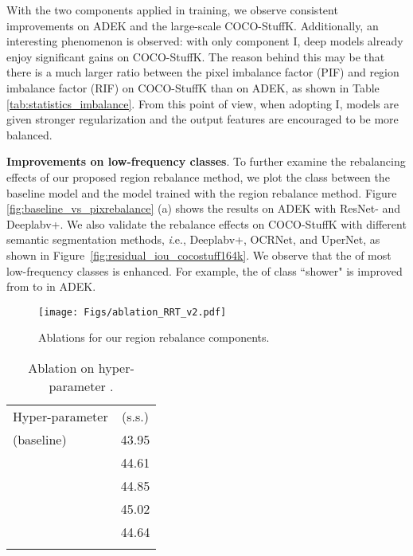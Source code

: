 \documentclass[final]{cvpr}
\begin{document}
With the two components applied in training, we observe consistent improvements on ADEK and the large-scale COCO-StuffK. Additionally, an interesting phenomenon is observed: with only component I, deep models already enjoy significant gains on COCO-StuffK. The reason behind this may be that there is a much larger ratio between the pixel imbalance factor (PIF) and region imbalance factor (RIF) on COCO-StuffK than on ADEK, as shown in Table \ref{tab:statistics_imbalance}. From this point of view, when adopting I, models are given stronger regularization and the output features are encouraged to be more balanced. 


\vspace{1mm}
\noindent\textbf{Improvements on low-frequency classes}.
To further examine the rebalancing effects of our proposed region rebalance method, we plot the class  between the baseline model and the model trained with the region rebalance method. Figure \ref{fig:baseline_vs_pixrebalance} (a) shows the results on ADEK with ResNet- and Deeplabv+. We also validate the rebalance effects on COCO-StuffK with different semantic segmentation methods, {\textit i.e.}, Deeplabv+, OCRNet, and UperNet, as shown in Figure~\ref{fig:residual_iou_cocostuff164k}. We observe that the  of most low-frequency classes is enhanced. For example, the  of class ``shower" is improved from  to  in ADEK.


\begin{figure}[t]
\centering
\texttt{[image: Figs/ablation\_RRT\_v2.pdf]}
\caption{Ablations for our region rebalance components.}
\label{fig:ablation_RRT}
\vspace{-0.1in}
\end{figure}


\begin{table}[t]
	\centering
	\setlength{\tabcolsep}{24pt}
	\caption{Ablation on hyper-parameter .}
	\label{tab:ablation_lamda}
	{
		\begin{tabular}{l|c}
			\shline
			Hyper-parameter   &(s.s.) \\
			\shline
			 (baseline) &43.95 \\
			\shline
              &44.61\\
              &44.85\\
              &45.02\\
              &44.64\\
			\shline
		\end{tabular}
	}
	\vspace{-0.15in}
\end{table}
\end{document}
